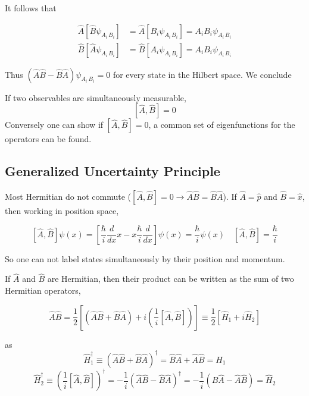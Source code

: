 It follows that 

\begin{align} \label{}
  \hat{A}[\hat{B}\psi_{A_i \, B_i}] &= \hat{A}[B_i \psi_{A_i \, B_i}] = A_i B_i
  \psi_{A_i\, B_i} \\ \hat{B}[\hat{A} \psi_{A_i \, B_i} ] &= \hat{B} [ A_i
  \psi_{A_i \, B_i } ] = A_i B_i \psi_{A_i \, B_i }
\end{align}\vspace{3px}

Thus $(\hat{A}\hat{B} - \hat{B}\hat{A}) \psi_{A_i \, B_i} = 0$ for every state
in the Hilbert space. We conclude 

\begin{mainbox}{}
  If two observables are simultaneously measurable, 
  \[
    [\hat{A}, \hat{B}] = 0
  \] \vspace{3px}
  Conversely one can show if $[\hat{A}, \hat{B}] = 0$, a common set of
  eigenfunctions for the operators can be found. 
\end{mainbox}

\subsection{Generalized Uncertainty Principle} 

Most Hermitian do not commute ($[\hat{A} , \hat{B}] = 0 \rightarrow
\hat{A}\hat{B} = \hat{B}\hat{A}$). If $\hat{A} = \hat{p}$ and $\hat{B}
= \hat{x}$, then working in position space, 

\[
  [\hat{A}, \hat{B}]\psi(x) = \left[ \frac{\hbar}{i} \frac{d }{d x}
  x - x \frac{\hbar}{i} \frac{d }{d x} \right] \psi(x) = \frac{\hbar}{i}
  \psi(x) \quad [\hat{A}, \hat{B}] = \frac{\hbar}{i}
\] \vspace{3px}

So one can not label states simultaneously by their position and momentum. 

If $\hat{A}$ and $\hat{B}$ are Hermitian, then their product can be written as
the sum of two Hermitian operators, 

\[
 \hat{A}\hat{B} = \frac{1}{2} \left[ (\hat{A}\hat{B} +  \hat{B}\hat{A})
+ i \left( \frac{1}{i} [\hat{A}, \hat{B}]\right) \right] \equiv \frac{1}{2}
\left[ \hat{H}_1 + i \hat{H}_2\right]
\] \vspace{3px}

as 
\[
  \hat{H}_1^\dagger \equiv \left( \hat{A}\hat{B}
  + \hat{B}\hat{A}\right)^\dagger = \hat{B}\hat{A} + \hat{A}\hat{B}
= \hat{H}_1 
\]
\[ \hat{H}_2^\dagger \equiv \left( \frac{1}{i} [\hat{A},
  \hat{B}]\right)^\dagger = -\frac{1}{i} (\hat{A}\hat{B}
  - \hat{B}\hat{A})^\dagger = -\frac{1}{i}(\hat{B}\hat{A} - \hat{A}\hat{B})
  = \hat{H}_2
\]


